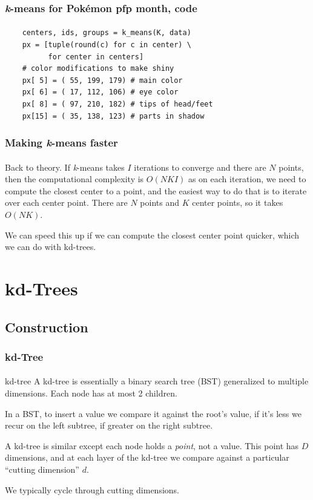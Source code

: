 \documentclass{beamer}                             %
\begin{document}
\begin{frame}[fragile]
\frametitle{\textit{k}-means for Pokémon pfp month, code}
\framesubtitle{}
\begin{verbatim}
    centers, ids, groups = k_means(K, data)
    px = [tuple(round(c) for c in center) \
          for center in centers]
    # color modifications to make shiny
    px[ 5] = ( 55, 199, 179) # main color
    px[ 6] = ( 17, 112, 106) # eye color 
    px[ 8] = ( 97, 210, 182) # tips of head/feet
    px[15] = ( 35, 138, 123) # parts in shadow
\end{verbatim}
\end{frame}

\begin{frame}
\frametitle{Making \textit{k}-means faster}
\framesubtitle{}

Back to theory. If \textit{k}-means takes \( I \) iterations to converge
and there are \( N \) points, then the computational complexity is \( O(NKI) \)
as on each iteration, we need to compute the closest center to a point,
and the easiest way to do that is to iterate over each center point. There
are \( N \) points and \( K \) center points, so it takes \( O(NK) \). \pause

We can speed this up if we can compute the closest center point quicker,
which we can do with \alert{kd-trees}. 

\end{frame}

\section{kd-Trees}
\subsection{Construction}

\begin{frame}
\frametitle{kd-Tree}
\framesubtitle{}
\begin{block}{kd-tree}
  A kd-tree is essentially a binary search tree (BST) generalized to multiple
  dimensions. Each node has at most 2 children.
\end{block}
In a BST, to insert a value we compare it against the root's value, if it's less
we recur on the left subtree, if greater on the right subtree. \pause

A kd-tree is similar except each node holds a \textit{point}, not a value.
This point has \( D \) dimensions, and at each layer of the kd-tree we compare
against a particular \enquote{cutting dimension} \( d \). \pause

We typically cycle through cutting dimensions. 
\end{frame}
\end{document}
